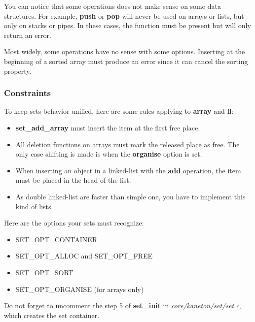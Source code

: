 You can notice  that some operations does not make  sense on some data
structures. For  example, \textbf{push} or \textbf{pop}  will never be
used on arrays or lists, but  only on stacks or pipes. In these cases,
the function must be present but will only return an error.

Most   widely,    some   operations   have   no    sense   with   some
options. Inserting at the beginning  of a sorted array must produce an
error since it can cancel the sorting property.

\subsubsection{Constraints}

To  keep  sets behavior  unified,  here  are  some rules  applying  to
\textbf{array} and \textbf{ll}:

\begin{itemize}

\item \textbf{set\_add\_array} must insert the item at the first free place.

\item All deletion functions on arrays must mark the released place as
free. The only case shifting is made is when the \textbf{organise} option
is set.

\item When inserting an object in a linked-list with the \textbf{add}
operation, the item must be placed in the head of the list.

\item As double linked-list are faster than simple one, you have to
implement this kind of lists.

\end{itemize}

Here are the options your sets must recognize:

\begin{itemize}
\item SET\_OPT\_CONTAINER
\item SET\_OPT\_ALLOC and SET\_OPT\_FREE
\item SET\_OPT\_SORT
\item SET\_OPT\_ORGANISE (for arrays only)
\end{itemize}

Do  not  forget to  uncomment  the  step  5 of  \textbf{set\_init}  in
\textit{core/kaneton/set/set.c}, which creates the set container.

